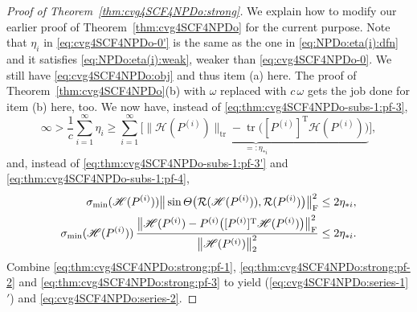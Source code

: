 \documentclass[11pt]{article}
\def\scrH{\mathscr{H}}
\def\cR{{\cal R}}
\DeclareMathOperator{\tr}{tr}
\DeclareMathOperator{\F}{F}
\DeclareMathOperator{\T}{T}
\theoremstyle{definition}
\numberwithin{equation}{section}
\begin{document}
\begin{proof}[Proof of Theorem~\ref{thm:cvg4SCF4NPDo:strong}]
We explain how to modify our earlier proof of Theorem~\ref{thm:cvg4SCF4NPDo} for the current purpose.
Note that $\eta_i$ in \eqref{eq:cvg4SCF4NPDo-0'} is the same as the one in \eqref{eq:NPDo:eta(i):dfn}
and it satisfies \eqref{eq:NPDo:eta(i):weak}, weaker than \eqref{eq:cvg4SCF4NPDo-0}.
We still have \eqref{eq:cvg4SCF4NPDo:obj} and thus item (a) here. The proof of
Theorem~\ref{thm:cvg4SCF4NPDo}(b) with $\omega$ replaced with $c\,\omega$ gets the job done for
item (b) here, too. We now have, instead of \eqref{eq:thm:cvg4SCF4NPDo-subs-1:pf-3},
\begin{equation}\label{eq:thm:cvg4SCF4NPDo:strong:pf-1}
\infty>\frac 1c\sum_{i=1}^{\infty}\eta_i\ge \sum_{i=1}^{\infty}\Big[\underbrace{\big\|\scrH(P^{(i)})\big\|_{\tr}-\tr\big([P^{(i)}]^{\T}\scrH(P^{(i)})\big)}_{=:\eta_{*i}}\Big],
\end{equation}
and, instead of \eqref{eq:thm:cvg4SCF4NPDo-subs-1:pf-3'} and \eqref{eq:thm:cvg4SCF4NPDo-subs-1:pf-4},
\begin{align}
\sigma_{\min}(\scrH(P^{(i)}))\big\|\sin\Theta\big(\cR(\scrH(P^{(i)})),\cR(P^{(i)})\big)\big\|_{\F}^2
    &\le 2\eta_{*i}, \label{eq:thm:cvg4SCF4NPDo:strong:pf-2} \\
\sigma_{\min}(\scrH(P^{(i)}))\,
    \frac {\big\|\scrH(P^{(i)})- P^{(i)}\big([ P^{(i)}]^{\T}\scrH(P^{(i)})\big)\big\|_{\F}^2}
          {\big\|\scrH(P^{(i)})\big\|_2^2}
   &\le 2\eta_{*i}.  \label{eq:thm:cvg4SCF4NPDo:strong:pf-3}
\end{align}
Combine \eqref{eq:thm:cvg4SCF4NPDo:strong:pf-1}, \eqref{eq:thm:cvg4SCF4NPDo:strong:pf-2} and \eqref{eq:thm:cvg4SCF4NPDo:strong:pf-3} to yield (\ref{eq:cvg4SCF4NPDo:series-1}$'$) and
\eqref{eq:cvg4SCF4NPDo:series-2}.
\end{proof}
\end{document}
